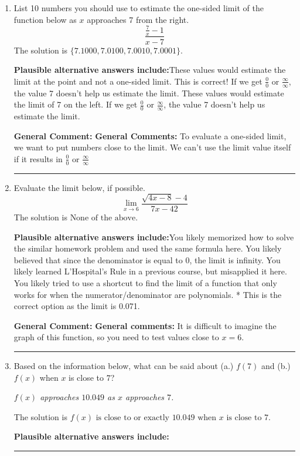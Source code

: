 \documentclass{extbook}[14pt]
\newcommand{\litem}[1]{\item #1

\rule{\textwidth}{0.4pt}}
\begin{document}
\begin{enumerate}\litem{
List 10 numbers you should use to estimate the one-sided limit of the function below as $x$ approaches 7 from the right.
\[ \frac{\frac{7}{x} - 1}{x - 7} \]The solution is \( \{ 7.1000, 7.0100, 7.0010, 7.0001 \} \).\begin{enumerate}[label=\Alph*.]
\textbf{Plausible alternative answers include:}These values would estimate the limit at the point and not a one-sided limit.
This is correct!
If we get $\frac{0}{0}$ or $\frac{\infty}{\infty}$, the value 7 doesn't help us estimate the limit.
These values would estimate the limit of 7 on the left.
If we get $\frac{0}{0}$ or $\frac{\infty}{\infty}$, the value 7 doesn't help us estimate the limit.
\end{enumerate}

\textbf{General Comment:} \textbf{General Comments:} To evaluate a one-sided limit, we want to put numbers close to the limit. We can't use the limit value itself if it results in $\frac{0}{0}$ or $\frac{\infty}{\infty}$
}
\litem{
Evaluate the limit below, if possible.
\[ \lim_{x \rightarrow 6} \frac{\sqrt{4x - 8} - 4}{7x - 42} \]The solution is \( \text{None of the above} \).\begin{enumerate}[label=\Alph*.]
\textbf{Plausible alternative answers include:}You likely memorized how to solve the similar homework problem and used the same formula here.
You likely believed that since the denominator is equal to 0, the limit is infinity.
You likely learned L'Hospital's Rule in a previous course, but misapplied it here.
You likely tried to use a shortcut to find the limit of a function that only works for when the numerator/denominator are polynomials.
* This is the correct option as the limit is 0.071.
\end{enumerate}

\textbf{General Comment:} \textbf{General comments:} It is difficult to imagine the graph of this function, so you need to test values close to $x = 6$.
}
\litem{
Based on the information below, what can be said about (a.) $f(7)$ and (b.) $f(x)$ when $x$ is close to $7$?

\begin{center}
    \textit{ $f(x)$ approaches $10.049$ as $x$ approaches $7$. }
\end{center}
The solution is \( f(x) \text{ is close to or exactly } 10.049 \text{ when } x \text{ is close to } 7 \).\begin{enumerate}[label=\Alph*.]
\textbf{Plausible alternative answers include:}





\end{enumerate}}
\end{enumerate}
\end{document}
